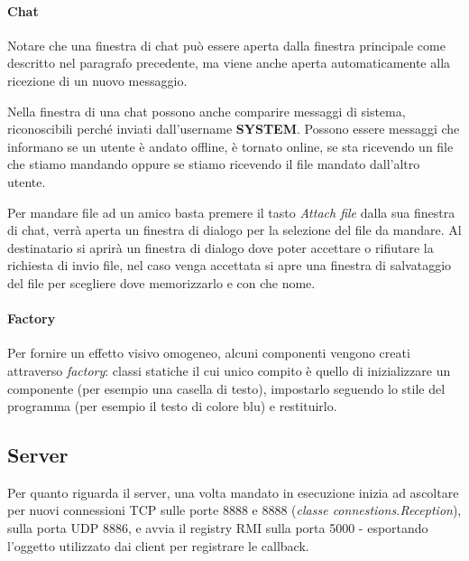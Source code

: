 \paragraph{Chat}
Notare che una finestra di chat può essere aperta dalla finestra principale come descritto nel paragrafo precedente, ma viene anche aperta automaticamente alla ricezione di un nuovo messaggio.

Nella finestra di una chat possono anche comparire messaggi di sistema, riconoscibili perché inviati dall'username \textbf{SYSTEM}. Possono essere messaggi che informano se un utente è andato offline, è tornato online, se sta ricevendo un file che stiamo mandando oppure se stiamo ricevendo il file mandato dall'altro utente.

Per mandare file ad un amico basta premere il tasto \textit{Attach file} dalla sua finestra di chat, verrà aperta un finestra di dialogo per la selezione del file da mandare. Al destinatario si aprirà un finestra di dialogo dove poter accettare o rifiutare la richiesta di invio file, nel caso venga accettata si apre una finestra di salvataggio del file per scegliere dove memorizzarlo e con che nome.

\begin{figure}[h]
    \centering
    \qquad
\end{figure}

\paragraph{Factory}
Per fornire un effetto visivo omogeneo, alcuni componenti vengono creati attraverso \textit{factory}: classi statiche il cui unico compito è quello di inizializzare un componente (per esempio una casella di testo), impostarlo seguendo lo stile del programma (per esempio il testo di colore blu) e restituirlo.

\subsection{Server}

Per quanto riguarda il server, una volta mandato in esecuzione inizia ad ascoltare per nuovi connessioni TCP sulle porte 8888 e 8888 (\textit{classe connestions.Reception}), sulla porta UDP 8886, e avvia il registry RMI sulla porta 5000 - esportando l'oggetto utilizzato dai client per registrare le callback.

